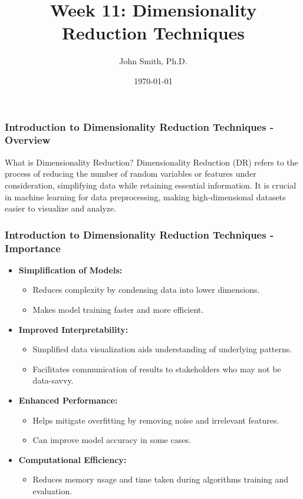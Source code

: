 \documentclass[aspectratio=169]{beamer}
\title[Dimensionality Reduction Techniques]{Week 11: Dimensionality Reduction Techniques}
\author[J. Smith]{John Smith, Ph.D.}
\institute[University Name]{
  Department of Computer Science\\
  University Name\\
  \vspace{0.3cm}
  Email: email@university.edu\\
  Website: www.university.edu
}
\date{\today}
\begin{document}
\frame{\titlepage}

\begin{frame}[fragile]
    \frametitle{Introduction to Dimensionality Reduction Techniques - Overview}
    \begin{block}{What is Dimensionality Reduction?}
        Dimensionality Reduction (DR) refers to the process of reducing the number of random variables or features under consideration, simplifying data while retaining essential information. It is crucial in machine learning for data preprocessing, making high-dimensional datasets easier to visualize and analyze.
    \end{block}
\end{frame}

\begin{frame}[fragile]
    \frametitle{Introduction to Dimensionality Reduction Techniques - Importance}
    \begin{itemize}
        \item \textbf{Simplification of Models:}
            \begin{itemize}
                \item Reduces complexity by condensing data into lower dimensions.
                \item Makes model training faster and more efficient.
            \end{itemize}
        \item \textbf{Improved Interpretability:}
            \begin{itemize}
                \item Simplified data visualization aids understanding of underlying patterns.
                \item Facilitates communication of results to stakeholders who may not be data-savvy.
            \end{itemize}
        \item \textbf{Enhanced Performance:}
            \begin{itemize}
                \item Helps mitigate overfitting by removing noise and irrelevant features.
                \item Can improve model accuracy in some cases.
            \end{itemize}
        \item \textbf{Computational Efficiency:}
            \begin{itemize}
                \item Reduces memory usage and time taken during algorithms training and evaluation.
            \end{itemize}
    \end{itemize}
\end{frame}
\end{document}
